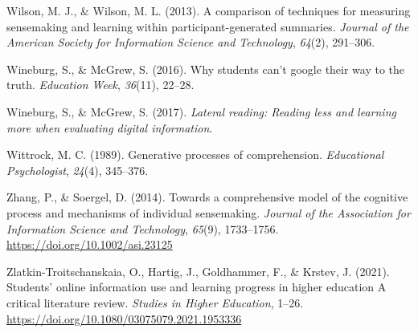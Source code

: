 \documentclass[letterpaper, nobind]{templates/ociamthesis}
\newlength{\cslhangindent}
\newenvironment{CSLReferences}[2] %
 {%
  \setlength{\parindent}{0pt}
  \ifodd #1
  \let\oldpar\par
  \def\par{\hangindent=\cslhangindent\oldpar}
  \fi
  \setlength{\parskip}{1mm}
  \setlength{\baselineskip}{6mm}
 }%
 {}
\begin{document}
\begin{CSLReferences}{1}{0}
\leavevmode{}%
Wilson, M. J., \& Wilson, M. L. (2013). A comparison of techniques for measuring sensemaking and learning within participant-generated summaries. \emph{Journal of the American Society for Information Science and Technology}, \emph{64}(2), 291--306.

\leavevmode{}%
Wineburg, S., \& McGrew, S. (2016). Why students can't google their way to the truth. \emph{Education Week}, \emph{36}(11), 22--28.

\leavevmode{}%
Wineburg, S., \& McGrew, S. (2017). \emph{Lateral reading: Reading less and learning more when evaluating digital information}.

\leavevmode{}%
Wittrock, M. C. (1989). Generative processes of comprehension. \emph{Educational Psychologist}, \emph{24}(4), 345--376.

\leavevmode{}%
Zhang, P., \& Soergel, D. (2014). Towards a comprehensive model of the cognitive process and mechanisms of individual sensemaking. \emph{Journal of the Association for Information Science and Technology}, \emph{65}(9), 1733--1756. \url{https://doi.org/10.1002/asi.23125}

\leavevmode{}%
Zlatkin-Troitschanskaia, O., Hartig, J., Goldhammer, F., \& Krstev, J. (2021). Students' online information use and learning progress in higher education \textendash{} {A} critical literature review. \emph{Studies in Higher Education}, 1--26. \url{https://doi.org/10.1080/03075079.2021.1953336}

\end{CSLReferences}

\end{document}
